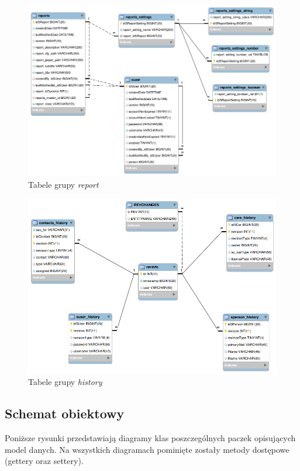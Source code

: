 	\begin{figure}[H]
		\centering
		\includegraphics[width=1.0\textwidth]{images/db/report}
		\caption[Tabele grupy \textit{report}]{
			Tabele grupy \textit{report}
		}
		\label{app:schema_db}
	\end{figure}
	\begin{figure}[H]
		\centering
		\includegraphics[width=1.0\textwidth]{images/db/history}
		\caption[Tabele grupy \textit{history}]{
			Tabele grupy \textit{history}
		}
		\label{app:schema_db}
	\end{figure}
	
	\clearpage
	\subsection{Schemat obiektowy}
	Poniższe rysunki przedstawiają diagramy klas poszczególnych paczek opisujących model danych. 
	Na wszystkich diagramach pominięte zostały metody dostępowe (gettery oraz settery). 
	
